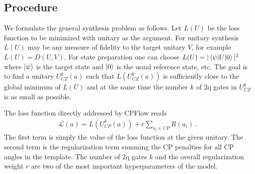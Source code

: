 \documentclass[twocolumn, amsfonts, amssymb, aps, nofootinbib]{revtex4-2}
\newcommand{\CP}{CP }
\begin{document}
\subsection{Procedure}
We formulate the general synthesis problem as follows. Let $L(U)$ be the loss function to be minimized with unitary as the argument. For unitary synthesis $L(U)$ may be any measure of fidelity to the target unitary $V$, for example $L(U)=D(U, V)$. For state preparation one can choose $L(U) = |\braket{\psi|U|0}|^2$ where $\ket{\psi}$ is the target state and $\ket{0}$ is the usual reference state, etc. The goal is to find a unitary $U^k_{CZ}(a)$ such that $L(U^k_{CZ}(a))$ is sufficiently close to the global minimum of $L(U)$ and at the same time the number $k$ of 2q gates in $U^k_{CZ}$ is as small as possible. 

The loss function directly addressed by CPFlow reads
\begin{align}
\mathcal{L}(a)=L(U^k_{CP}(a))+r\sum_{a_i\in CP} R(a_i) \ . \label{CP loss}
\end{align}
The first term is simply the value of the loss function at the given unitary. The second term is the regularization term summing the \CP penalties for all \CP angles in the template. The number of 2q gates $k$ and the overall regularization weight $r$ are two of the most important hyperparameters of the model.
\end{document}
